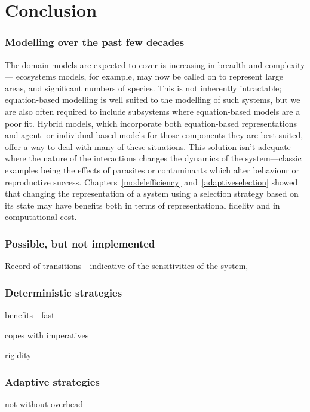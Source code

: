 
\chapter[CONCLUSION]{Conclusion}\label{concl}

\subsection{Modelling over the past few decades}

The domain models are expected to cover is increasing in breadth and
complexity --- ecosystems models, for example, may now be called on to
represent large areas, and significant numbers of species.  This is
not inherently intractable; equation-based modelling is well suited to
the modelling of such systems, but we are also often required to
include subsystems where equation-based models are a poor fit. Hybrid
models, which incorporate both equation-based representations and
agent- or individual-based models for those components they are best
suited, offer a way to deal with many of these situations.  This
solution isn't adequate where the nature of the interactions changes
the dynamics of the system---classic examples being the effects of
parasites or contaminants which alter behaviour or reproductive
success. Chapters~\ref{modelefficiency} and~\ref{adaptiveselection}
showed that changing the representation of a system using a selection
strategy based on its state may have benefits both in terms of
representational fidelity and in computational cost.  

\subsection{Possible, but not implemented}

Record of transitions---indicative of the sensitivities of the
system, 




\subsection{Deterministic strategies}
benefits---fast

copes with imperatives

rigidity

\subsection{Adaptive strategies}
not without overhead

